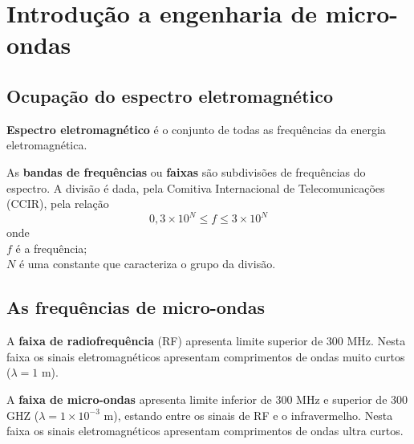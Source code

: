 \chapter{Introdução a engenharia de micro-ondas}
\section{Ocupação do espectro eletromagnético}
\textbf{Espectro eletromagnético} é o conjunto de todas as frequências da energia eletromagnética.


As \textbf{bandas de frequências} ou \textbf{faixas} são subdivisões de frequências do espectro. A divisão é dada, pela Comitiva Internacional de Telecomunicações (CCIR),  pela relação
\begin{equation}
	0,3\times 10^N\leq f\leq 3\times 10^N
\end{equation}
onde\\
$f$ é a frequência;\\
$N$ é uma constante que caracteriza o grupo da divisão.

\section{As frequências de micro-ondas}

A \textbf{faixa de radiofrequência} (RF) apresenta limite superior de 300 MHz. Nesta faixa os sinais eletromagnéticos apresentam comprimentos de ondas muito curtos ($\lambda=1$ m).


A \textbf{faixa de micro-ondas} apresenta limite inferior de 300 MHz e superior de 300 GHZ ($\lambda=1\times 10^{-3}$ m), estando entre os sinais de RF e o infravermelho. Nesta faixa os sinais eletromagnéticos apresentam comprimentos de ondas ultra curtos.


